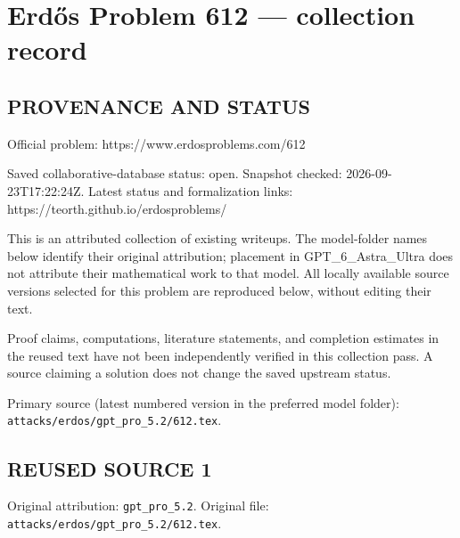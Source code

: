 \section*{Erd\H{o}s Problem 612 --- collection record}

\subsection*{PROVENANCE AND STATUS}
Official problem: https://www.erdosproblems.com/612

Saved collaborative-database status: open.
Snapshot checked: 2026-09-23T17:22:24Z.
Latest status and formalization links: https://teorth.github.io/erdosproblems/

This is an attributed collection of existing writeups. The model-folder names below identify their original attribution; placement in GPT\_6\_Astra\_Ultra does not attribute their mathematical work to that model. All locally available source versions selected for this problem are reproduced below, without editing their text.

Proof claims, computations, literature statements, and completion estimates in the reused text have not been independently verified in this collection pass. A source claiming a solution does not change the saved upstream status.

Primary source (latest numbered version in the preferred model folder): \texttt{attacks/erdos/gpt\_pro\_5.2/612.tex}.

\subsection*{REUSED SOURCE 1}
Original attribution: \texttt{gpt\_pro\_5.2}.
Original file: \texttt{attacks/erdos/gpt\_pro\_5.2/612.tex}.


